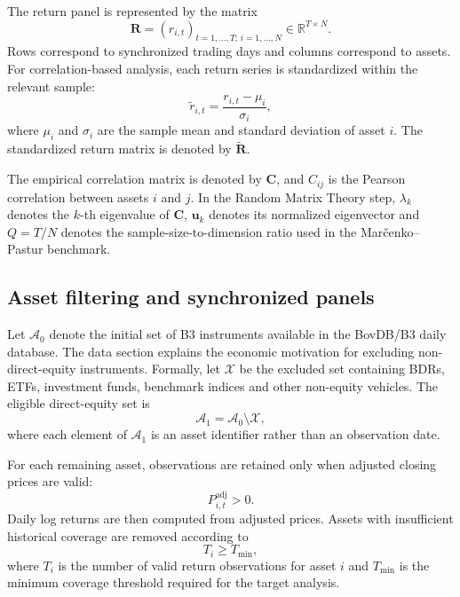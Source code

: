 The return panel is represented by the matrix
\begin{equation}
\mathbf{R}
=
\left(r_{i,t}\right)_{t=1,\ldots,T;\,i=1,\ldots,N}
\in
\mathbb{R}^{T \times N}.
\end{equation}
Rows correspond to synchronized trading days and columns correspond to assets. For correlation-based analysis, each return series is standardized within the relevant sample:
\begin{equation}
\tilde{r}_{i,t}
=
\frac{r_{i,t}-\mu_i}{\sigma_i},
\end{equation}
where $\mu_i$ and $\sigma_i$ are the sample mean and standard deviation of asset $i$. The standardized return matrix is denoted by $\widetilde{\mathbf{R}}$.

The empirical correlation matrix is denoted by $\mathbf{C}$, and $C_{ij}$ is the Pearson correlation between assets $i$ and $j$. In the Random Matrix Theory step, $\lambda_k$ denotes the $k$-th eigenvalue of $\mathbf{C}$, $\mathbf{u}_k$ denotes its normalized eigenvector and $Q=T/N$ denotes the sample-size-to-dimension ratio used in the Mar\v{c}enko--Pastur benchmark.

\subsection{Asset filtering and synchronized panels}
\label{subsec:asset_filtering}

Let $\mathcal{A}_0$ denote the initial set of B3 instruments available in the BovDB/B3 daily database. The data section explains the economic motivation for excluding non-direct-equity instruments. Formally, let $\mathcal{X}$ be the excluded set containing BDRs, ETFs, investment funds, benchmark indices and other non-equity vehicles. The eligible direct-equity set is
\begin{equation}
\mathcal{A}_1
=
\mathcal{A}_0
\setminus
\mathcal{X},
\end{equation}
where each element of $\mathcal{A}_1$ is an asset identifier rather than an observation date.

For each remaining asset, observations are retained only when adjusted closing prices are valid:
\begin{equation}
P^{\mathrm{adj}}_{i,t} > 0.
\end{equation}
Daily log returns are then computed from adjusted prices. Assets with insufficient historical coverage are removed according to
\begin{equation}
T_i \geq T_{\min},
\end{equation}
where $T_i$ is the number of valid return observations for asset $i$ and $T_{\min}$ is the minimum coverage threshold required for the target analysis.

